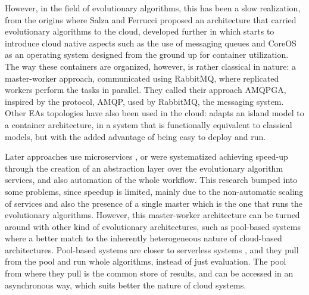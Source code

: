 \documentclass[review]{elsarticle}
\begin{document}
However, in the field of evolutionary algorithms, this has been a slow
realization, from the origins where Salza and Ferrucci
\cite{salza2016approach,salza2016develop} proposed an architecture
that carried evolutionary algorithms to the cloud, developed further
in \cite{de2017parallel} which starts to introduce cloud native
aspects such as the use of messaging queues and CoreOS as an operating
system designed from the ground up for container utilization. The way
these containers are organized, however, is rather classical in
nature: a master-worker approach, communicated using RabbitMQ, where
replicated workers perform the tasks in parallel. They called their
approach AMQPGA, inspired by the protocol, AMQP, used by RabbitMQ, the
messaging system. Other EAs topologies have also been used in the
cloud: \cite{dziurzanski2020scalable} adapts an island model to a
container architecture, in a system that is functionally equivalent to
classical models, but with the added advantage of being easy to deploy
and run.

Later approaches use microservices \cite{khalloof2018generic}, or were
systematized \cite{salza2019speed} achieving speed-up through the
creation of an abstraction layer over the evolutionary algorithm
services, and also automation of the whole workflow. This research
bumped into some problems, since speedup is limited, mainly due to the
non-automatic scaling of services and also the presence of a single
master which is the one that runs the evolutionary
algorithms. However, this master-worker architecture can be turned
around with other kind of evolutionary architectures, such
as pool-based systems
\cite{valenzuela2015implementing,merelo2012sofea,sofea:cec2012} where
a better match to the inherently heterogeneous nature of cloud-based
architectures. Pool-based systems are closer to serverless systems
\cite{malawski2017serverless}, and they pull from the pool and run
whole algorithms, instead of just evaluation. The pool from where they
pull is the common store of results, and can be accessed in an
asynchronous way, which suits better the nature of cloud systems.



\end{document}
